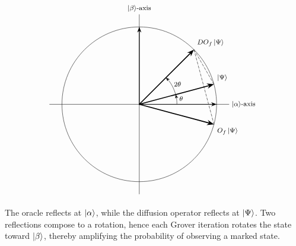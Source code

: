 \[
\begin{tikzpicture}[
  scale=0.95,
  >=Stealth,
  line cap=round,
  line join=round,
  every node/.style={font=\footnotesize}
]
  \def\thetaplot{15}
  \def\veclen{3.45}
  \coordinate (o) at (0,0);

  \draw[thin] (o) circle[radius=\veclen];

  \draw[] (-4.0,0) -- (4.0,0) node[right] {\(\ket{\alpha}\)-axis};
  \draw[] (0,-4.0) -- (0,4.0) node[above] {\(\ket{\beta}\)-axis};

  \draw[->,thick] (o) -- (0:\veclen); %
  \draw[->,thick] (o) -- (90:\veclen); %

  \draw[->,very thick,black] (o) -- (\thetaplot:\veclen) node[pos=1.0,above right] {\(\ket{\Psi}\)};
  \draw[->,very thick,black] (o) -- (-\thetaplot:\veclen) node[below right] {\(O_f\ket{\Psi}\)};
  \draw[->,very thick,black] (o) -- ({3*\thetaplot}:\veclen) node[above right] {\(D O_f \ket{\Psi}\)};

  \coordinate (oracle) at (-\thetaplot:\veclen);
  \coordinate (psi) at (\thetaplot:\veclen);
  \coordinate (grover) at ({3*\thetaplot}:\veclen);

  \draw[densely dashed,black] (oracle) -- (grover);
  \draw[densely dashed,black] (grover) -- (psi);

  \draw[->] (1.68,0) arc[start angle=0,end angle=\thetaplot,radius=1.68] node[pos=0.58,right] {\(\theta\)};
  \draw[->] (\thetaplot:1.68) arc[start angle=\thetaplot,end angle={3*\thetaplot},radius=1.68] node[pos=0.58,right] {\(2\theta\)};

\end{tikzpicture}
\]

The oracle reflects at
\(
\ket{\alpha}
\),
while the diffusion operator reflects at
\(
\ket{\Psi}
\).
Two reflections compose to a rotation, hence each Grover iteration rotates the state toward
\(
\ket{\beta}
\),
thereby amplifying the probability of observing a marked state.

